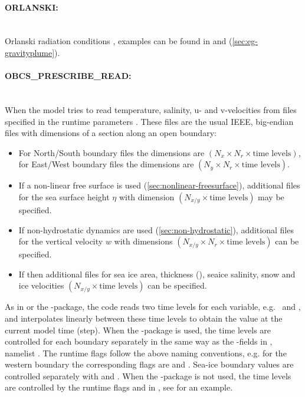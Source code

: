 \paragraph{ORLANSKI:} ~ \\
%
Orlanski radiation conditions \citep{orl:76}, examples can be found in
 and
(\ref{sec:eg-gravityplume}).

\paragraph{OBCS\_PRESCRIBE\_READ:} ~ \\
%
When  the model tries to read
temperature, salinity, u- and v-velocities from files specified in the
runtime parameters . These files are
the usual IEEE, big-endian files with dimensions of a section along an
open boundary:
\begin{itemize}
\item For North/South boundary files the dimensions are
  $(N_x\times N_r\times\mbox{time levels})$, for East/West boundary
  files the dimensions are $(N_y\times N_r\times\mbox{time levels})$.
\item If a non-linear free surface is used
  (\ref{sec:nonlinear-freesurface}), additional files
   for the sea surface height $\eta$ with
  dimension $(N_{x/y}\times\mbox{time levels})$ may be specified.
\item If non-hydrostatic dynamics are used
  (\ref{sec:non-hydrostatic}), additional files
   for the vertical velocity $w$ with
  dimensions $(N_{x/y}\times N_r\times\mbox{time levels})$ can be
  specified.
\item If  then additional files
   for sea ice area, thickness
  (), seaice salinity, snow and ice velocities
  $(N_{x/y}\times\mbox{time levels})$ can be specified.
\end{itemize}
As in  or the -package, the
code reads two time levels for each variable, e.g.\  and
, and interpolates linearly between these time levels to
obtain the value  at the current model time (step). When the
-package is used, the time levels are controlled for each
boundary separately in the same way as the -fields in
, namelist . The runtime flags
follow the above naming conventions, e.g. for the western boundary the
corresponding flags are  and
. Sea-ice boundary values are controlled separately
with  and .  When the
-package is not used, the time levels are controlled by the
runtime flags  and 
in , see  for an example.

